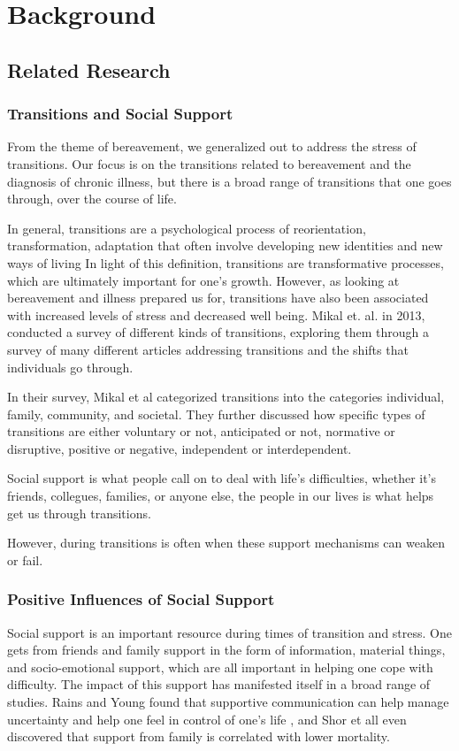 \chapter{Background}
\section{Related Research}
  \subsection{Transitions and Social Support}
    From the theme of bereavement, we generalized out to address the stress of transitions.
    Our focus is on the transitions related to bereavement and the diagnosis of chronic illness,
    but there is a broad range of transitions that one goes through,
    over the course of life.

    In general, transitions are a psychological process of reorientation, transformation, adaptation
    that often involve developing new identities and new ways of living
    \cite{kralik_06}
    In light of this definition, transitions are transformative processes,
    which are ultimately important for one's growth.
    However, as looking at bereavement and illness prepared us for,
    transitions have also been associated with increased levels of stress and decreased well being.
    \cite{mikal_13}
    Mikal et. al. in 2013, conducted a survey of different kinds of transitions,
    exploring them through a survey of many different articles addressing transitions and
    the shifts that individuals go through.

    In their survey, Mikal et al categorized transitions into the categories
    individual, family, community, and societal.
    They further discussed how specific types of transitions are either voluntary or not, anticipated or not,
    normative or disruptive, positive or negative, independent or interdependent.
    
    Social support is what people call on to deal with life's difficulties,
    whether it's friends, collegues, families, or anyone else, the people in our lives
    is what helps get us through transitions.
    
    However, during transitions is often when these support mechanisms can weaken or fail.
    \cite{mikal_13}

  \subsection{Positive Influences of Social Support}
    Social support is an important resource during times of transition and stress.
    One gets from friends and family support in the form of
    information, material things, and socio-emotional support,
    which are all important in helping one cope with difficulty.
    The impact of this support has manifested itself in a broad range of studies.
    Rains and Young found that supportive communication can help manage uncertainty and
    help one feel in control of one's life \cite{rains_09},
    and Shor et all even discovered that support from
    family is correlated with lower mortality. \cite{shor_13}

